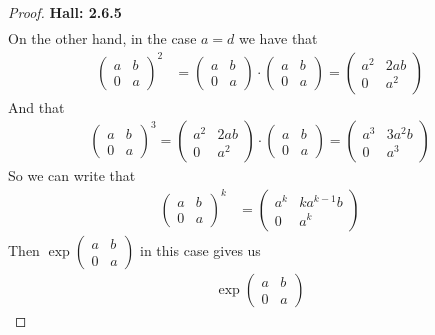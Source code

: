 \documentclass[11pt]{article}
\theoremstyle{definition}
\begin{document}
\begin{proof}{\textbf{Hall: 2.6.5}}
\begin{align*}
    \end{align*}
    On the other hand, in the case $a = d$ we have that 
    \begin{align*}
        \begin{pmatrix} a & b\\ 0 & a \end{pmatrix}^2
        &= \begin{pmatrix} a & b\\ 0 & a \end{pmatrix}
        \cdot \begin{pmatrix} a & b\\ 0 & a \end{pmatrix}
        = \begin{pmatrix} a^2 & 2ab\\ 0 & a^2 \end{pmatrix}
    \end{align*}
    And that 
    \begin{align*}
        \begin{pmatrix} a & b\\ 0 & a \end{pmatrix}^3
        = \begin{pmatrix} a^2 & 2ab\\ 0 & a^2 \end{pmatrix}
        \cdot \begin{pmatrix} a & b\\ 0 & a \end{pmatrix}
        = \begin{pmatrix} a^3 & 3a^2b\\ 0 & a^3\end{pmatrix}
    \end{align*}
    So we can write that
    \begin{align*}
        \begin{pmatrix} a & b\\ 0 & a \end{pmatrix}^k
        &= \begin{pmatrix} a^k & ka^{k-1}b\\ 0 & a^k\end{pmatrix}
    \end{align*}
    Then $\exp\begin{pmatrix} a & b\\ 0 & a\end{pmatrix}$ in this case gives us
    \begin{align*}
        \exp\begin{pmatrix} a & b\\ 0 & a\end{pmatrix}

\end{align*}
\end{proof}
\end{document}
